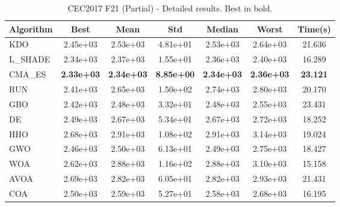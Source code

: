 \begin{table}[H]
\centering\small
\caption{CEC2017 F21 (Partial) - Detailed results. Best in bold.}
\label{tab:cec2017_F21}
\begin{tabular}{lcccccc}
\toprule
\textbf{Algorithm} & \textbf{Best} & \textbf{Mean} & \textbf{Std} & \textbf{Median} & \textbf{Worst} & \textbf{Time(s)} \\
\midrule
KDO & 2.45e+03 & 2.53e+03 & 4.81e+01 & 2.53e+03 & 2.64e+03 & 21.636 \\
L_SHADE & 2.34e+03 & 2.37e+03 & 1.55e+01 & 2.36e+03 & 2.40e+03 & 16.289 \\
CMA_ES & \textbf{2.33e+03} & \textbf{2.34e+03} & \textbf{8.85e+00} & \textbf{2.34e+03} & \textbf{2.36e+03} & \textbf{23.121} \\
RUN & 2.41e+03 & 2.65e+03 & 1.50e+02 & 2.74e+03 & 2.80e+03 & 20.170 \\
GBO & 2.42e+03 & 2.48e+03 & 3.32e+01 & 2.48e+03 & 2.55e+03 & 23.431 \\
DE & 2.49e+03 & 2.67e+03 & 5.34e+01 & 2.67e+03 & 2.72e+03 & 18.252 \\
HHO & 2.68e+03 & 2.91e+03 & 1.08e+02 & 2.91e+03 & 3.14e+03 & 19.024 \\
GWO & 2.46e+03 & 2.50e+03 & 6.13e+01 & 2.49e+03 & 2.75e+03 & 18.427 \\
WOA & 2.62e+03 & 2.88e+03 & 1.16e+02 & 2.88e+03 & 3.10e+03 & 15.158 \\
AVOA & 2.69e+03 & 2.82e+03 & 6.05e+01 & 2.82e+03 & 2.93e+03 & 21.431 \\
COA & 2.50e+03 & 2.59e+03 & 5.27e+01 & 2.58e+03 & 2.68e+03 & 16.195 \\
\bottomrule
\end{tabular}
\end{table}
